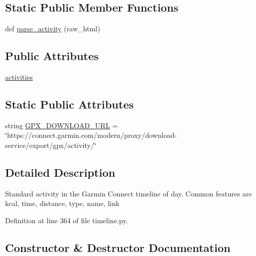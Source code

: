 \subsection*{Static Public Member Functions}
\begin{DoxyCompactItemize}
\item 
def \hyperlink{classpygce_1_1models_1_1garmin_1_1timeline_1_1_g_c_day_activities_a3e5401673c704697c90e814affe368ca}{parse\+\_\+activity} (raw\+\_\+html)
\end{DoxyCompactItemize}
\subsection*{Public Attributes}
\begin{DoxyCompactItemize}
\item 
\hyperlink{classpygce_1_1models_1_1garmin_1_1timeline_1_1_g_c_day_activities_a8f48f44c8208989ea0741bad614ae652}{activities}
\end{DoxyCompactItemize}
\subsection*{Static Public Attributes}
\begin{DoxyCompactItemize}
\item 
string \hyperlink{classpygce_1_1models_1_1garmin_1_1timeline_1_1_g_c_day_activities_a7c9d6ef796f6dff125216b04b40dc668}{G\+P\+X\+\_\+\+D\+O\+W\+N\+L\+O\+A\+D\+\_\+\+U\+RL} = \char`\"{}https\+://connect.\+garmin.\+com/modern/proxy/download-\/service/export/gpx/activity/\char`\"{}
\end{DoxyCompactItemize}


\subsection{Detailed Description}
\begin{DoxyVerb}Standard activity in the Garmin Connect timeline of day.
Common features are kcal, time, distance, type, name, link
\end{DoxyVerb}
 

Definition at line 364 of file timeline.\+py.



\subsection{Constructor \& Destructor Documentation}
\mbox{\label{classpygce_1_1models_1_1garmin_1_1timeline_1_1_g_c_day_activities_abde52d1321a233947e2585e7ed43415b}} 
